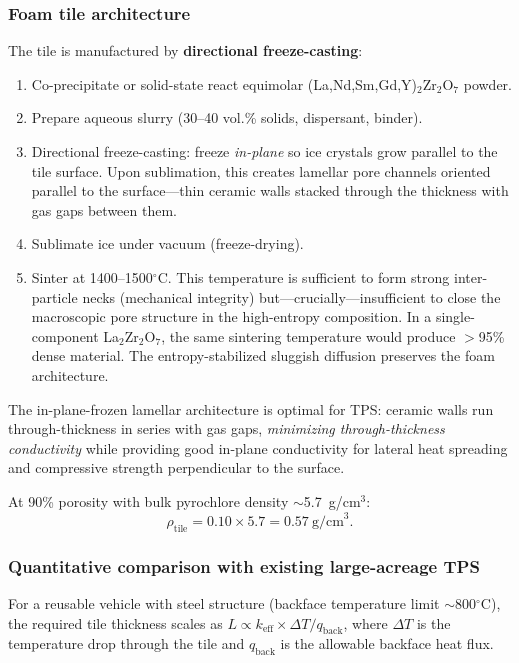 \documentclass[12pt,letterpaper]{article}
\theoremstyle{definition}
\begin{document}
\subsubsection{Foam tile architecture}

The tile is manufactured by \textbf{directional freeze-casting}:

\begin{enumerate}
  \item Co-precipitate or solid-state react equimolar (La,Nd,Sm,Gd,Y)$_2$Zr$_2$O$_7$ powder.
  \item Prepare aqueous slurry (30--40 vol.\% solids, dispersant, binder).
  \item Directional freeze-casting: freeze \emph{in-plane} so ice crystals grow parallel to the tile surface.  Upon sublimation, this creates lamellar pore channels oriented parallel to the surface---thin ceramic walls stacked through the thickness with gas gaps between them.
  \item Sublimate ice under vacuum (freeze-drying).
  \item Sinter at 1400--1500$^\circ$C.  This temperature is sufficient to form strong inter-particle necks (mechanical integrity) but---crucially---insufficient to close the macroscopic pore structure in the high-entropy composition.  In a single-component La$_2$Zr$_2$O$_7$, the same sintering temperature would produce $>$95\% dense material.  The entropy-stabilized sluggish diffusion preserves the foam architecture.
\end{enumerate}

The in-plane-frozen lamellar architecture is optimal for TPS\@: ceramic walls run through-thickness in series with gas gaps, \emph{minimizing through-thickness conductivity} while providing good in-plane conductivity for lateral heat spreading and compressive strength perpendicular to the surface.

At 90\% porosity with bulk pyrochlore density $\sim$5.7~g/cm$^3$:
\[
\rho_{\mathrm{tile}} = 0.10 \times 5.7 = 0.57~\text{g/cm}^3.
\]

\subsubsection{Quantitative comparison with existing large-acreage TPS}

For a reusable vehicle with steel structure (backface temperature limit $\sim$800$^\circ$C), the required tile thickness scales as $L \propto k_{\mathrm{eff}} \times \Delta T / q_{\mathrm{back}}$, where $\Delta T$ is the temperature drop through the tile and $q_{\mathrm{back}}$ is the allowable backface heat flux.
\end{document}
